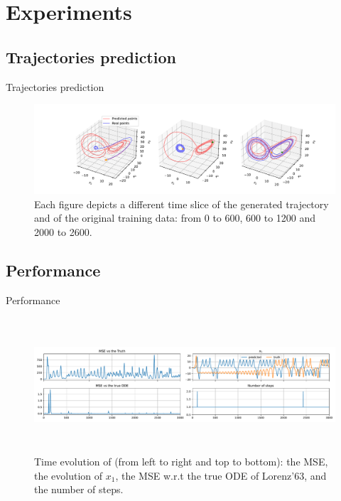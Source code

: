 \documentclass{EESD}
\begin{document}
\section{Experiments}

\subsection{Trajectories prediction}
\begin{frame}{Trajectories prediction}
    \begin{figure}
        \centering
        \hspace*{-1.5cm}
        \includegraphics[width=16cm]{baseline_lorenz_3}
        \caption{Each figure depicts a different time slice of the
          generated trajectory and of the original training data: from
          0 to 600, 600 to 1200 and 2000 to 2600.}
        \label{fig:lorenz}
    \end{figure}
\end{frame}


\subsection{Performance}
\begin{frame}{Performance}
    \begin{figure}
        \centering
        \includegraphics[width=14cm, height=5cm]{baseline_time_series_2x2}
        \caption{Time evolution of (from left to right and top to bottom): the MSE, the evolution of $x_1$, the MSE w.r.t the true ODE of Lorenz’63, and the number of steps.}
        \label{fig:lorenz_error}
    \end{figure}                                                    
\end{frame}
\end{document}
